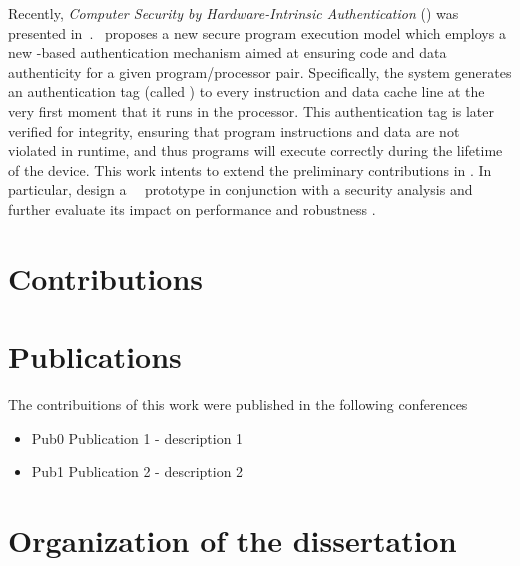 Recently, \textit{Computer Security by Hardware-Intrinsic Authentication} (\system) was presented in~\cite{Hoffman2015}. \system~proposes a new secure program execution model which employs a new \puf-based authentication mechanism aimed at ensuring code and data authenticity for a given program\slash{}processor pair. Specifically, the system generates an authentication tag (called \ptag) to every instruction and data cache line at the very first moment that it runs in the processor. This authentication tag is later verified for integrity, ensuring that program instructions and data are not violated in runtime, and thus programs will execute correctly during the lifetime of the device. This work  intents to extend the preliminary contributions in \cite{Hoffman2015}. In particular, design a \cshia~\fpga~prototype in conjunction with a security analysis and further evaluate its impact on performance and robustness .

\section{Contributions}
\label{sec:contributions}
\lorenipsuns

\section{Publications}
\label{sec:publications}
The contribuitions of this work were published  in the following conferences 
\begin{itemize}
\item{Pub0} Publication 1  - description 1
\item{Pub1} Publication 2 - description 2
\end{itemize}

\section{Organization of the dissertation}
\label{sec:organization_of_dissertation}
\lorenipsuns
 

